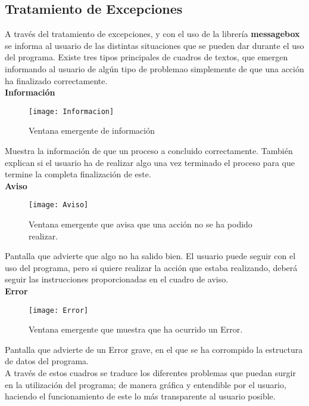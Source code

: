 \subsection{Tratamiento de Excepciones}
A través del tratamiento de excepciones, y con el uso de la librería \textbf{messagebox} se informa al usuario de las distintas situaciones que se pueden dar durante el uso del programa. Existe tres tipos principales de cuadros de textos, que emergen informando al usuario de algún tipo de problemao simplemente de que una acción ha finalizado correctamente.\\


\textbf{Información}\\

\begin{figure}[h]
\centering
\texttt{[image: Informacion]} 
\caption{Ventana emergente de información}
\end{figure}
Muestra la información de que un proceso a concluido correctamente. También explican si el usuario ha de realizar algo una vez terminado el proceso para que termine la completa finalización de este.\\


\textbf{Aviso}\\

\begin{figure}[ht]
\centering
\texttt{[image: Aviso]} 
\caption{Ventana emergente que avisa que una acción no se ha podido realizar.}
\end{figure}
Pantalla que advierte que algo no ha salido bien. El usuario puede seguir con el uso del programa, pero si quiere realizar la acción que estaba realizando, deberá seguir las instrucciones proporcionadas en el cuadro de aviso.\\

\textbf{Error}\\

\begin{figure}[ht]
\centering
\texttt{[image: Error]} 
\caption{Ventana emergente que muestra que ha ocurrido un Error.}
\end{figure}
Pantalla que advierte de un Error grave, en el que se ha corrompido la estructura de datos del programa.\\

A través de estos cuadros se traduce los diferentes problemas que puedan surgir en la utilización del programa; de manera gráfica y entendible por el usuario, haciendo el funcionamiento de este lo más transparente al usuario posible.

